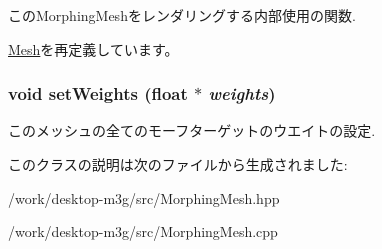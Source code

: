 このMorphingMeshをレンダリングする内部使用の関数. 

\hyperlink{classm3g_1_1Mesh_1efcb1973989d9963d5bd6d03065d389}{Mesh}を再定義しています。\hypertarget{classm3g_1_1MorphingMesh_53e2beef0efdccecfe4d7ab7b719c738}{
\subsubsection[{setWeights}]{\setlength{\rightskip}{0pt plus 5cm}void setWeights (float $\ast$ {\em weights})}}
\label{classm3g_1_1MorphingMesh_53e2beef0efdccecfe4d7ab7b719c738}


このメッシュの全てのモーフターゲットのウエイトの設定. 

このクラスの説明は次のファイルから生成されました:\begin{CompactItemize}
\item 
/work/desktop-m3g/src/MorphingMesh.hpp\item 
/work/desktop-m3g/src/MorphingMesh.cpp\end{CompactItemize}
